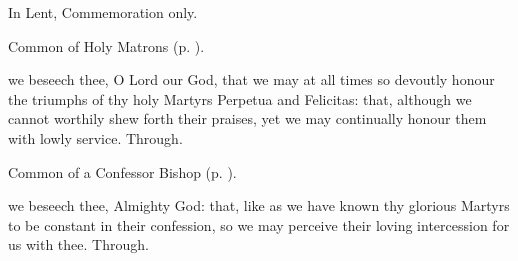 
\begin{rubric}
	In Lent, Commemoration only.
\end{rubric}

\begin{rubric}
	Common of Holy Matrons (p. \pageref{CommonHolyMatrons}).
\end{rubric}

 we beseech thee, O Lord our God, that we may at all times so devoutly honour the triumphs of thy holy Martyrs Perpetua and Felicitas: that, although we cannot worthily shew forth their praises, yet we may continually honour them with lowly service. Through.



\begin{rubric}
	Common of a Confessor Bishop (p. \pageref{ConfessorBishopDoctorCollect}).
\end{rubric}



\memorialCollect
{} we beseech thee, Almighty God: that, like as we have known thy glorious Martyrs to be constant in their confession, so we may perceive their loving intercession for us with thee. Through.



